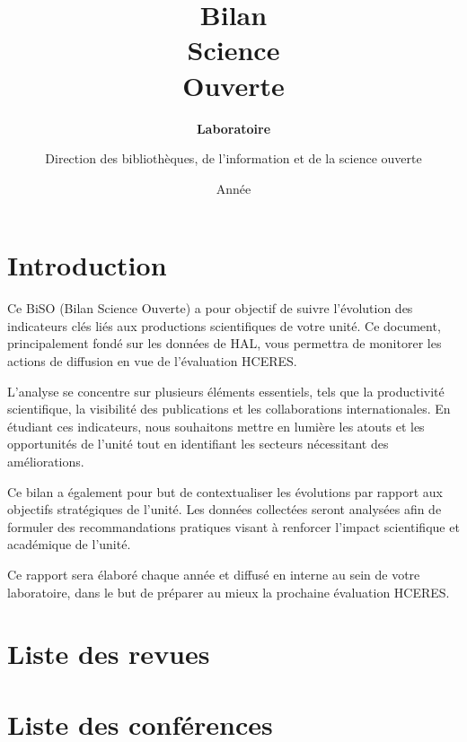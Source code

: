 \documentclass[french, 11pt]{../../dibiso/biso}
\title{Bilan \\ Science \\ Ouverte}
\author{Direction des bibliothèques, de l’information et de la science ouverte}
\date{Année \reportyear}
\subtitle{\textbf{Laboratoire \labacronym} \\
  \medskip
  \labfullname
}
\begin{document}
\renewcommand{\arraystretch}{1.5}


\maketitle

\tableofcontents

\pagebreak



\section{Introduction}

Ce BiSO (Bilan Science Ouverte) a pour objectif de suivre l'évolution des indicateurs clés liés aux productions scientifiques de votre unité. Ce document, principalement fondé sur les données de HAL, vous permettra de monitorer les actions de diffusion en vue de l'évaluation HCERES.

L'analyse se concentre sur plusieurs éléments essentiels, tels que la productivité scientifique, la visibilité des publications et les collaborations internationales. En étudiant ces indicateurs, nous souhaitons mettre en
lumière les atouts et les opportunités de l'unité tout en identifiant les secteurs nécessitant des améliorations.

Ce bilan a également pour but de contextualiser les évolutions par rapport aux objectifs stratégiques de l'unité. Les données collectées seront analysées afin de formuler des recommandations pratiques visant à renforcer l'impact
scientifique et académique de l'unité.

Ce rapport sera élaboré chaque année et diffusé en interne au sein de votre laboratoire, dans le but de préparer au mieux la prochaine évaluation HCERES.



\pagebreak

\section{Liste des revues}

{
  \footnotesize
  
}

\pagebreak

\section{Liste des conférences}
\end{document}
